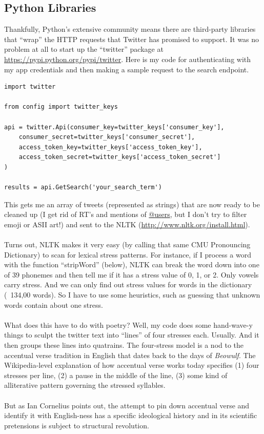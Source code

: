 \documentclass[a0,final]{a0poster}
\begin{document}
\begin{multicols}{3}
\section*{Python Libraries}
Thankfully, Python's extensive community means there are third-party libraries that ``wrap'' the HTTP requests that Twitter has promised to support. It was no problem at all to start up the ``twitter'' package at \url{https://pypi.python.org/pypi/twitter}. Here is my code for authenticating with my app credentials and then making a sample request to the search endpoint.\\

\begin{verbatim}
import twitter

from config import twitter_keys

api = twitter.Api(consumer_key=twitter_keys['consumer_key'],
	consumer_secret=twitter_keys['consumer_secret'],
	access_token_key=twitter_keys['access_token_key'],
	access_token_secret=twitter_keys['access_token_secret']
)

results = api.GetSearch('your_search_term')
\end{verbatim}
This gets me an array of tweets (represented as strings) that are now ready to be cleaned up (I get rid of RT's and mentions of \url{@users}, but I don't try to filter emoji or ASII art!) and sent to the NLTK (\url{http://www.nltk.org/install.html}).\\
\\
Turns out, NLTK makes it very easy (by calling that same CMU Pronouncing Dictionary) to scan for lexical stress patterns. For instance, if I process a word with the function ``stripWord'' (below), NLTK can break the word down into one of 39 phonemes and then tell me if it has a stress value of 0, 1, or 2. Only vowels carry stress. And we can only find out stress values for words in the dictionary (~134,00 words). So I have to use some heuristics, such as guessing that unknown words contain about one stress.\\
\\
What does this have to do with poetry? Well, my code does some hand-wave-y things to sculpt the twitter text into ``lines'' of four stresses each. Usually. And it then groups these lines into quatrains. The four-stress model is a nod to the accentual verse tradition in English that dates back to the days of \emph{Beowulf}. The Wikipedia-level explanation of how accentual verse works today specifies (1) four stresses per line, (2) a pause in the middle of the line, (3) some kind of alliterative pattern governing the stressed syllables.\\
\\
But as Ian Cornelius points out, the attempt to pin down accentual verse and identify it with English-ness has a specific ideological history and in its scientific pretensions is subject to structural revolution.


\end{multicols}
\end{document}
